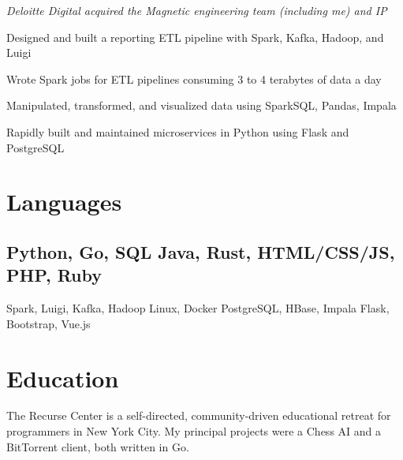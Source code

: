 \documentclass[]{deedy-resume-openfont}
\begin{document}
\vspace{\topsep} %
\textit{Deloitte Digital acquired the Magnetic engineering team (including me) and IP}
\vspace{\topsep} %
\begin{tightemize}
\item Designed and built a reporting ETL pipeline with Spark, Kafka, Hadoop, and Luigi
\item Wrote Spark jobs for ETL pipelines consuming 3 to 4 terabytes of data a day
\item Manipulated, transformed, and visualized data using SparkSQL, Pandas, Impala
\item Rapidly built and maintained microservices in Python using Flask and PostgreSQL
\end{tightemize}
\sectionsep

\section{Languages}
\vspace{\topsep} %
\subsection{Python, Go, SQL \textbullet{} Java, Rust, HTML/CSS/JS, PHP, Ruby}
\vspace{\topsep} %
Spark, Luigi, Kafka, Hadoop \textbullet{} Linux, Docker \textbullet{} PostgreSQL, HBase, Impala \textbullet{} Flask, Bootstrap, Vue.js
\sectionsep


\section{Education}
\vspace{\topsep} %
\vspace{\topsep} %
The Recurse Center is a self-directed, community-driven educational retreat for programmers in New York City.\newline
My principal projects were a Chess AI and a BitTorrent client, both written in Go.
\sectionsep
\end{document}
